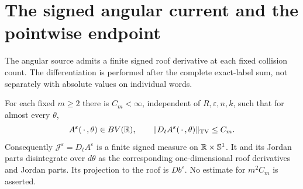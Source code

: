 \section{The signed angular current and the pointwise endpoint}
\label{sec:v77-current}
The angular source admits a finite signed roof derivative at each
fixed collision count. The differentiation is performed after the
complete exact-label sum, not separately with absolute values on
individual words.

\begin{theorem}
\label{thm:v77-angular-bv}
For each fixed $m\ge2$ there is $C_m<\infty$, independent of
$R,\varepsilon,n,k$, such that for almost every $\theta$,
\begin{equation}\label{eq:v77-angular-bv}
 A^\varepsilon(\,\cdot\,,\theta)\in BV(\R),\qquad
 \|D_t A^\varepsilon(\,\cdot\,,\theta)\|_{\TV}\le C_m.
\end{equation}
Consequently $\mathscr J^\varepsilon=D_tA^\varepsilon$ is a finite
signed measure on $\mathbb R\times\mathbb S^1$. It and its Jordan parts
disintegrate over $d\theta$ as the corresponding one-dimensional
roof derivatives and Jordan parts. Its projection to the roof is
$Db^\varepsilon$. No estimate for $m^2C_m$ is asserted.
\end{theorem}
